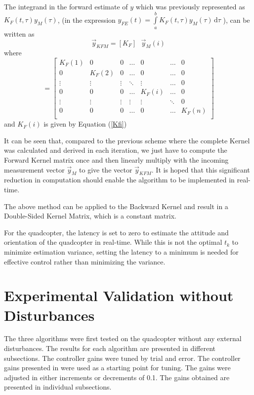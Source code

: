 \documentclass[letterpaper%
, twoside%
, 12pt%
,memoire%
, english%
,creativecommons,hyperref%
]{thETS}
\theoremstyle{newThmStyle}
\begin{document}
The integrand in the forward estimate of $y$ which was previously represented as
$K_F(t,\tau) y_M(\tau)$, 
(in the expression $y_{FE}(t) =\int\limits_{a}^{b}K_F(t,\tau) y_M(\tau)\, \mathrm{d}\tau $ ), 
can be written as 
$$ \vec{y}_{KFM} = [K_F] \textrm{ } \vec{y}_M(i)$$
where 
\begin{equation*}
[K_F] =
\begin{bmatrix}
    K_F(1) &    0   &   0    & \dots  &    0    & \dots  &   0 \\
      0    & K_F(2) &   0    & \dots  &    0    & \dots  &   0 \\
    \vdots & \vdots & \vdots & \ddots & \vdots  & \dots  &   0 \\
      0    &   0    &   0    & \dots  &  K_F(i) & \dots  &   0 \\ 
    \vdots & \vdots & \vdots & \vdots & \vdots  & \ddots &   0 \\
      0    &   0    &   0    & \dots  &    0    & \dots  &   K_F(n) \\
\end{bmatrix}
\end{equation*}
and $K_F(i)$ is given by Equation (\ref{Kfi})

It can be seen that, compared to the previous scheme where the complete Kernel was calculated and derived in each iteration, we just have to compute the Forward Kernel matrix once and then linearly multiply with the incoming measurement vector $\vec{y}_M$ to give the vector $\vec{y}_{KFM}$.
It is hoped that this significant reduction in computation should enable the algorithm to be implemented in real-time. 

The above method can be applied to the Backward Kernel and result in a Double-Sided Kernel Matrix, which is a constant matrix.

For the quadcopter, the latency is set to zero to estimate the attitude and orientation of the quadcopter in real-time. While this is not the optimal $t_k$ to minimize estimation variance, setting the latency to a minimum is needed for effective control rather than minimizing the variance. 

\section{Experimental Validation without Disturbances}
The three algorithms were first tested on the quadcopter without any external disturbances. The results for each algorithm are presented in different subsections. The controller gains were tuned by trial and error. The controller gains presented in \citep{RN117} were used as a starting point for tuning. The gains were adjusted in either increments or decrements of 0.1. The gains obtained are presented in individual subsections. 
\end{document}
